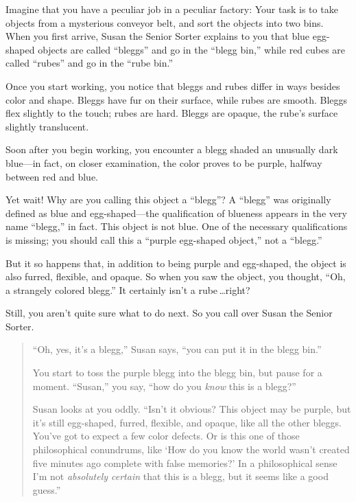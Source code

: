 {{{
 Imagine that you have a peculiar job in a peculiar factory: Your
task is to take objects from a mysterious conveyor belt, and sort the
objects into two bins. When you first arrive, Susan the Senior Sorter
explains to you that blue egg-shaped objects are called
``bleggs'' and go in the
``blegg bin,'' while red cubes are
called ``rubes'' and go in the
``rube bin.'' }

{
 Once you start working, you notice that bleggs and rubes differ in
ways besides color and shape. Bleggs have fur on their surface, while
rubes are smooth. Bleggs flex slightly to the touch; rubes are hard.
Bleggs are opaque, the rube's surface slightly
translucent.}

{
 Soon after you begin working, you encounter a blegg shaded an
unusually dark blue---in fact, on closer examination, the color proves
to be purple, halfway between red and blue.}

{
 Yet wait! Why are you calling this object a
``blegg''? A
``blegg'' was originally defined as
blue and egg-shaped---the qualification of blueness appears in the very
name ``blegg,'' in fact. This object
is not blue. One of the necessary qualifications is missing; you should
call this a ``purple egg-shaped
object,'' not a
``blegg.''}

{
 But it so happens that, in addition to being purple and
egg-shaped, the object is also furred, flexible, and opaque. So when
you saw the object, you thought, ``Oh, a strangely
colored blegg.'' It certainly isn't a
rube\,\ldots right?}

{
 Still, you aren't quite sure what to do next. So
you call over Susan the Senior Sorter.}

\begin{quotation}
{
 ``Oh, yes, it's a
blegg,'' Susan says, ``you can put
it in the blegg bin.''}

{
 You start to toss the purple blegg into the blegg bin, but pause
for a moment. ``Susan,'' you say,
``how do you \textit{know} this is a
blegg?''}

{
 Susan looks at you oddly. ``Isn't
it obvious? This object may be purple, but it's still
egg-shaped, furred, flexible, and opaque, like all the other bleggs.
You've got to expect a few color defects. Or is this
one of those philosophical conundrums, like `How do you
know the world wasn't created five minutes ago complete
with false memories?' In a philosophical sense
I'm not \textit{absolutely certain} that this is a
blegg, but it seems like a good guess.''}


\end{quotation}}}
